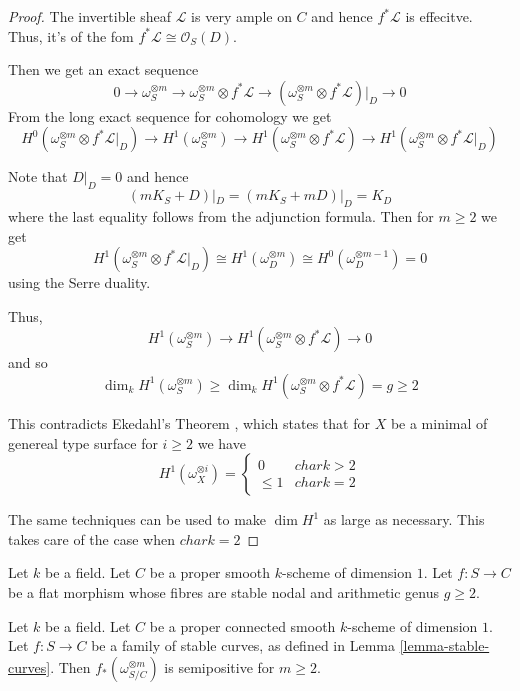 \begin{proof}
The invertible sheaf $\mathcal{L}$ is very ample on $C$ and hence $f^*\mathcal{L}$ is effecitve. Thus, it's of the fom $f^*\mathcal{L}\cong \mathcal{O}_S(D)$.

Then we get an exact sequence $$0\to \omega_S^{\otimes m}\to \omega^{\otimes m}_S\otimes f^*\mathcal{L}\to (\omega_S^{\otimes m}\otimes f^*\mathcal{L})|_D\to 0$$ From the long exact sequence for cohomology we get $$H^0(\omega^{\otimes m}_S\otimes f^*\mathcal{L}|_D)\to H^1(\omega_S^{\otimes m})\to H^1(\omega_S^{\otimes m}\otimes f^*\mathcal{L})\to H^1(\omega_S^{\otimes m}\otimes f^*\mathcal{L}|_D)$$

Note that $D|_D=0$ and hence $$(mK_S+D)|_D=(mK_S+mD)|_D=K_D$$ where the last equality follows from the adjunction formula. Then for $m\geq 2$ we get $$H^1(\omega_S^{\otimes m}\otimes f^*\mathcal{L}|_D)\cong H^1(\omega_D^{\otimes m})\cong H^0(\omega_D^{\otimes m-1})=0$$ using the Serre duality.

Thus, $$H^1(\omega_S^{\otimes m})\to H^1(\omega_S^{\otimes m}\otimes f^*\mathcal{L})\to 0$$ and so $$\dim_k H^1(\omega_S^{\otimes m})\geq \dim_k H^1(\omega_S^{\otimes m}\otimes f^*\mathcal{L})=g\geq 2$$

This contradicts Ekedahl's Theorem , which states that for $X$ be a minimal of genereal type surface for $i\geq 2$ we have $$H^1(\omega_X^{\otimes i})=\begin{cases} 0 &char k>2\\ \leq 1 & char k=2\end{cases}$$

The same techniques can be used to make $\dim H^1$ as large as necessary. This takes care of the case when $char k=2$
\end{proof}


\begin{lemma}
\label{lemma-stable-curves-semipositive-resolve}
Let $k$ be a field.
Let $C$ be a proper smooth $k$-scheme of dimension $1$.
Let $f : S \to C$ be a flat morphism whose fibres are stable nodal and arithmetic
genus $g \geq 2$.
\end{lemma}

\begin{lemma}[cf.\ {\cite[Theorem 4.3]{Ko90}}]
\label{lemma-stable-curves-semipositive}
Let $k$ be a field.
Let $C$ be a proper connected smooth $k$-scheme of dimension $1$.
Let $f : S \to C$ be a family of stable curves,
as defined in Lemma \ref{lemma-stable-curves}.
Then $f_*(\omega_{S/C}^{\otimes m})$ is semipositive for $m \geq 2$.


\end{lemma}


